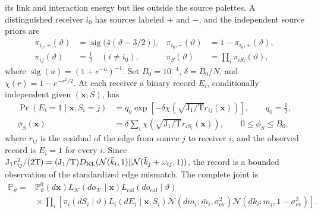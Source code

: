 its link and interaction energy but lies outside the source palettes. A distinguished receiver \(i_0\) has sources
labeled \(+\) and \(-\), and the independent source priors are
\begin{equation}
\begin{aligned}
\pi_{i_0,+}(\vartheta)
  &=\operatorname{sig}\bigl(4(\vartheta-3/2)\bigr),&
\pi_{i_0,-}(\vartheta)&=1-\pi_{i_0,+}(\vartheta),\\
\pi_{ij}(\vartheta)&=\tfrac12\quad(i\ne i_0),&
\pi_S(\vartheta)&=\prod_i\pi_{iS_i}(\vartheta),
\end{aligned}
\label{eq:rg-formation-source-priors}
\end{equation}
where \(\operatorname{sig}(u)=(1+e^{-u})^{-1}\). Set
\(B_0=10^{-4}\), \(\delta=B_0/N\), and \(\chi(r)=1-e^{-r^2/2}\). At each
receiver a binary record \(E_i\), conditionally independent given
\((\mathbf x,S)\), has
\begin{equation}
\begin{aligned}
\Pr(E_i=1\mid\mathbf x,S_i=j)
  &=q_0\exp\left[-\delta\chi\left(\sqrt{\mathrm J_1/\mathrm T} r_{ij}(\mathbf x)\right)\right],
       \qquad q_0=\tfrac12,\\
\phi_S(\mathbf x)&=\delta\sum_i
       \chi\left(\sqrt{\mathrm J_1/\mathrm T} r_{iS_i}(\mathbf x)\right),
       \qquad 0\le\phi_S\le B_0,
\end{aligned}
\label{eq:rg-formation-source-record}
\end{equation}
where \(r_{ij}\) is the residual of the edge from source \(j\) to receiver
\(i\), and the observed record is \(E_i=1\) for every \(i\). Since
\(\mathrm J_1r_{ij}^2/(2\mathrm T)=(\mathrm J_1/\mathrm T)
D_{\mathrm{KL}}(\mathcal N(\bar k_i,1)\Vert\mathcal N(\bar k_j+\omega_{ij},1))\), the
record is a bounded observation of the standardized edge mismatch. The
complete joint is
\begin{equation}
\begin{aligned}
\mathbb P_\vartheta
={}&\mathbb P^0_\vartheta(d\mathbf x)
 L_{\mathcal K}(do_{\mathcal K}\mid\mathbf x)
 L_{\mathrm{cal}}(do_{\mathrm{cal}}\mid\vartheta)\\
&{}\times\prod_i\left[
 \pi_i(dS_i\mid\vartheta)L_i(dE_i\mid\mathbf x,S_i)
 \mathcal N(dm_i;\bar m_i,\sigma^2_{\mathrm{ev}})
 \mathcal N(dk_i;m_i,1-\sigma^2_{\mathrm{ev}})\right].
\end{aligned}
\label{eq:rg-formation-full-joint}
\end{equation}

